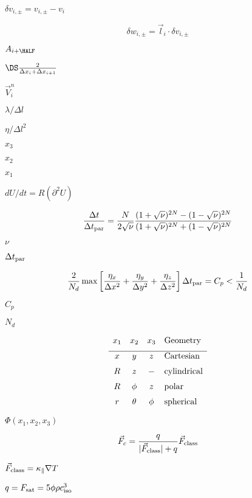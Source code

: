 \documentclass{article}
\begin{document}
$\delta v_{i,\pm} = v_{i,\pm} - v_i$
\pagebreak

\[
    \delta w_{i,\pm} = \vec{l}_i\cdot\delta v_{i,\pm}
\]
\pagebreak

$A_{i+\HALF}$
\pagebreak

$\DS \frac{2}{\Delta x_i +
 \Delta x_{i+1}}$
\pagebreak

$ \vec{V}^n_i $
\pagebreak

$ \lambda/\Delta l$
\pagebreak

$ \eta/\Delta l^2$
\pagebreak

$x_3$
\pagebreak

$x_2$
\pagebreak

$x_1$
\pagebreak

$ dU/dt = R(\partial^2U)  $
\pagebreak

\[
  \frac{\Delta t}{\Delta t_{\rm par}}
   =
  \frac{N}{2\sqrt{\nu}}\frac{(1+\sqrt{\nu})^{2N} - (1-\sqrt{\nu})^{2N}}
                            {(1+\sqrt{\nu})^{2N} + (1-\sqrt{\nu})^{2N}}
\]
\pagebreak

$\nu$
\pagebreak

$\Delta t_{\rm par}$
\pagebreak

\[
  \frac{2}{N_d} \max\left[  \frac{\eta_x}{\Delta x^2} 
                          + \frac{\eta_y}{\Delta y^2} 
                          + \frac{\eta_z}{\Delta z^2} \right] 
  \Delta t_{\rm par} = C_p < \frac{1}{N_d}
\]
\pagebreak

$C_p$
\pagebreak

$ N_d $
\pagebreak

\[ \begin{array}{cccl}
   x_1  & x_2    & x_3  & \mathrm{Geometry}    \\ \noalign{\medskip}
    \hline
   x    &   y    &  z   & \mathrm{Cartesian}   \\ \noalign{\medskip}
   R    &   z    &  -   & \mathrm{cylindrical} \\ \noalign{\medskip}
   R    & \phi   &  z   & \mathrm{polar}       \\ \noalign{\medskip}
   r    & \theta & \phi & \mathrm{spherical} 
   \end{array}
 \]
\pagebreak

$ \Phi(x_1,x_2,x_3) $
\pagebreak

\[
   \vec{F}_c = \frac{q}{|\vec{F}_{\rm class}| + q}\vec{F}_{\rm class}
\]
\pagebreak

$ \vec{F}_{\rm class} = \kappa_\parallel \nabla T$
\pagebreak

$ q = F_{\rm sat} = 5\phi \rho c_{\rm iso}^3$
\pagebreak
\end{document}
